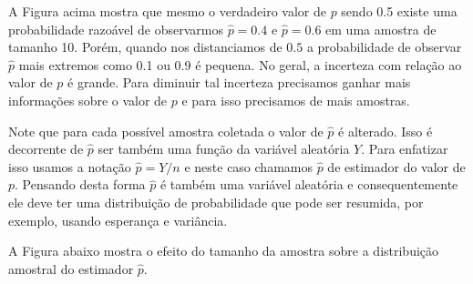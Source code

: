 \documentclass[
  10pt,
  a4paper]{book}
\begin{document}
A Figura acima mostra que mesmo o verdadeiro valor de \(p\) sendo 0.5 existe uma probabilidade razoável de observarmos \(\hat{p} = 0.4\) e \(\hat{p} = 0.6\) em uma amostra de tamanho 10. Porém, quando nos distanciamos de \(0.5\) a probabilidade de observar \(\hat{p}\) mais extremos como 0.1 ou 0.9 é pequena. No geral, a incerteza com relação ao valor de \(p\) é grande. Para diminuir tal incerteza precisamos ganhar mais informações sobre o valor de \(p\) e para isso precisamos de mais amostras.

Note que para cada possível amostra coletada o valor de \(\hat{p}\) é alterado. Isso é decorrente de \(\hat{p}\) ser também uma função da variável aleatória \(Y\). Para enfatizar isso usamos a notação \(\hat{p} = Y/n\) e neste caso chamamos \(\hat{p}\) de estimador do valor de \(p\). Pensando desta forma \(\hat{p}\) é também uma variável aleatória e consequentemente ele deve ter uma distribuição de probabilidade que pode ser resumida, por exemplo, usando esperança e variância.

A Figura abaixo mostra o efeito do tamanho da amostra sobre a distribuição amostral do estimador \(\hat{p}\).
\end{document}
